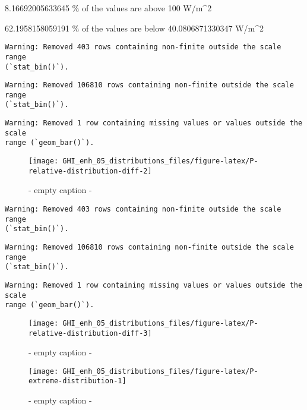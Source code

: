 \documentclass[
  10pt,
  a4paper,oneside]{article}
\begin{document}
8.16692005633645 \% of the values are above 100 W/m\^{}2

62.1958158059191 \% of the values are below 40.0806871330347 W/m\^{}2

\begin{verbatim}
Warning: Removed 403 rows containing non-finite outside the scale range
(`stat_bin()`).
\end{verbatim}

\begin{verbatim}
Warning: Removed 106810 rows containing non-finite outside the scale range
(`stat_bin()`).
\end{verbatim}

\begin{verbatim}
Warning: Removed 1 row containing missing values or values outside the scale
range (`geom_bar()`).
\end{verbatim}

\begin{figure}[H]

{\centering \texttt{[image: GHI\_enh\_05\_distributions\_files/figure-latex/P-relative-distribution-diff-2]} 

}

\caption{ - empty caption - }\label{fig:P-relative-distribution-diff-2}
\end{figure}

\begin{verbatim}
Warning: Removed 403 rows containing non-finite outside the scale range
(`stat_bin()`).
\end{verbatim}

\begin{verbatim}
Warning: Removed 106810 rows containing non-finite outside the scale range
(`stat_bin()`).
\end{verbatim}

\begin{verbatim}
Warning: Removed 1 row containing missing values or values outside the scale
range (`geom_bar()`).
\end{verbatim}

\begin{figure}[H]

{\centering \texttt{[image: GHI\_enh\_05\_distributions\_files/figure-latex/P-relative-distribution-diff-3]} 

}

\caption{ - empty caption - }\label{fig:P-relative-distribution-diff-3}
\end{figure}
\begin{figure}[H]

{\centering \texttt{[image: GHI\_enh\_05\_distributions\_files/figure-latex/P-extreme-distribution-1]} 

}

\caption{ - empty caption - }\label{fig:P-extreme-distribution-1}
\end{figure}
\end{document}
